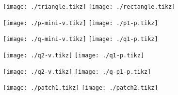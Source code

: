 \documentclass{article}
\begin{document}
\texttt{[image: ./triangle.tikz]}
\texttt{[image: ./rectangle.tikz]}

\texttt{[image: ./p-mini-v.tikz]}
\texttt{[image: ./p1-p.tikz]}

\texttt{[image: ./q-mini-v.tikz]}
\texttt{[image: ./q1-p.tikz]}

\texttt{[image: ./q2-v.tikz]}
\texttt{[image: ./q1-p.tikz]}

\texttt{[image: ./q2-v.tikz]}
\texttt{[image: ./q-p1-p.tikz]}

\texttt{[image: ./patch1.tikz]}
\texttt{[image: ./patch2.tikz]}
\end{document}
